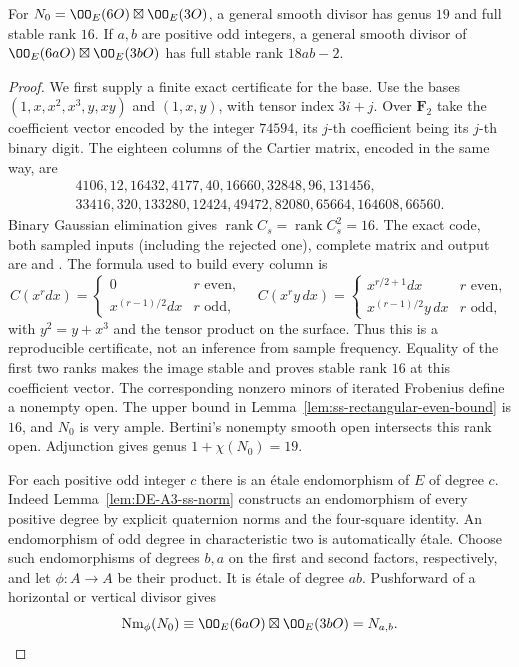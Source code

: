 \begin{lemma}
\label{lem:ss-rectangular-base-norm}
For $N_0=\OO_E(6O)\boxtimes\OO_E(3O)$, a general smooth divisor
has genus $19$ and full stable rank $16$.
If $a,b$ are positive odd integers, a general smooth divisor of
$\OO_E(6aO)\boxtimes\OO_E(3bO)$ has full stable rank $18ab-2$.
\end{lemma}
\begin{proof}
We first supply a finite exact certificate for the base.  Use the bases
$(1,x,x^2,x^3,y,xy)$ and $(1,x,y)$, with tensor index $3i+j$.
Over $\mathbf F_2$ take the coefficient vector encoded by the integer
$74594$, its $j$-th coefficient being its $j$-th binary digit.
The eighteen columns of the Cartier matrix, encoded in the same way,
are
\[
\begin{gathered}
4106,12,16432,4177,40,16660,32848,96,131456,\\
33416,320,133280,12424,49472,82080,65664,164608,66560.
\end{gathered}
\]
Binary Gaussian elimination gives
$\operatorname{rank}C_s=\operatorname{rank}C_s^2=16$.
The exact code, both sampled inputs (including the rejected one),
complete matrix and output are
 and
.
The formula used to build every column is
\[
 C(x^r dx)=\begin{cases}0&r\text{ even},\\x^{(r-1)/2}dx&r\text{ odd},\end{cases}
\quad
 C(x^r y\,dx)=\begin{cases}x^{r/2+1}dx&r\text{ even},\\
                       x^{(r-1)/2}y\,dx&r\text{ odd},\end{cases}
\]
with $y^2=y+x^3$ and the tensor product on the surface.
Thus this is a reproducible certificate, not an inference from
sample frequency.  Equality of the first two ranks makes the image
stable and proves stable rank $16$ at this coefficient vector.
The corresponding nonzero minors of iterated Frobenius define a
nonempty open.  The upper bound in
Lemma~\ref{lem:ss-rectangular-even-bound} is $16$, and $N_0$ is very
ample.  Bertini's nonempty smooth open intersects this rank open.
Adjunction gives genus $1+\chi(N_0)=19$.

For each positive odd integer $c$ there is an \'etale endomorphism of
$E$ of degree $c$.  Indeed Lemma~\ref{lem:DE-A3-ss-norm} constructs
an endomorphism of every positive degree by explicit quaternion norms
and the four-square identity.  An endomorphism of odd degree in
characteristic two is automatically \'etale.
Choose such endomorphisms of degrees $b,a$ on the first and second
factors, respectively, and let $\phi:A\to A$ be their product.
It is \'etale of degree $ab$.  Pushforward of a horizontal or vertical
divisor gives
\[
     \operatorname{Nm}_\phi(N_0)\equiv
                  \OO_E(6aO)\boxtimes\OO_E(3bO)=N_{a,b}.
\]


\end{proof}

